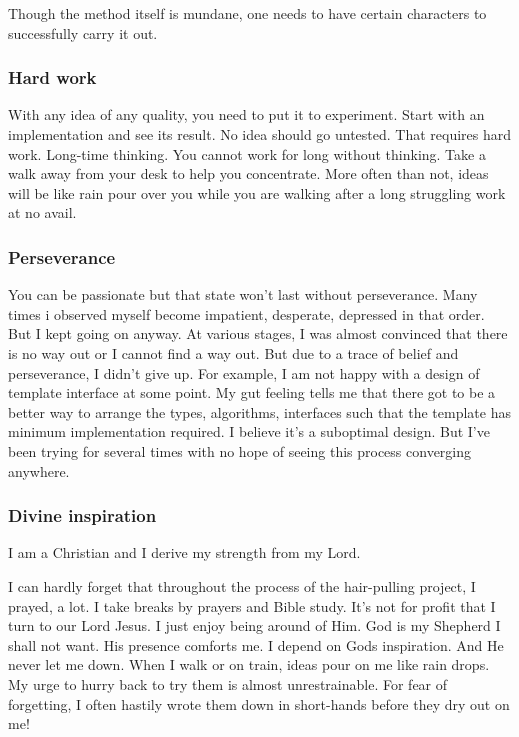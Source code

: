 \documentclass[oneside,11pt]{book}
\theoremstyle{definition}
\theoremstyle{remark}
\begin{document}
Though the method itself is mundane, one needs to have certain
characters to successfully carry it out.

\subsubsection{Hard work}

With any idea of any quality, you need to put it to experiment.
Start with an implementation and see its result.
No idea should go untested.
That requires hard work.
Long-time thinking.
You cannot work for long without thinking.
Take a walk away from your desk to help you concentrate.
More often than not, ideas will be like rain pour over you while you are walking after a long
struggling work at no avail.

\subsubsection{Perseverance}

You can be passionate but that state won't last without perseverance.
Many times i observed myself become impatient, desperate, depressed in that order.
But I kept going on anyway.
At various stages, I was almost convinced that there is no way out or I cannot find a way out.
But due to a trace of belief and perseverance, I didn't give up.
For example, I am not happy with a design of template interface at some point.
My gut feeling tells me that there got to be a better way to arrange the types, algorithms, interfaces such that
the template has minimum implementation required.
I believe it's a suboptimal design.
But I've been trying for several times with no hope of seeing this process converging anywhere.

\subsubsection{Divine inspiration}

I am a Christian and I derive my strength from my Lord.

I can hardly forget that throughout the process of the hair-pulling project, I prayed, a lot.
I take breaks by prayers and Bible study.
It's not for profit that I turn to our Lord Jesus.
I just enjoy being around of Him.
God is my Shepherd I shall not want.
His presence comforts me.
I depend on Gods inspiration.
And He never let me down.
When I walk or on train, ideas pour on me like rain drops.
My urge to hurry back to try them is almost unrestrainable.
For fear of forgetting, I often hastily wrote them down in short-hands before they dry out on me!
\end{document}
